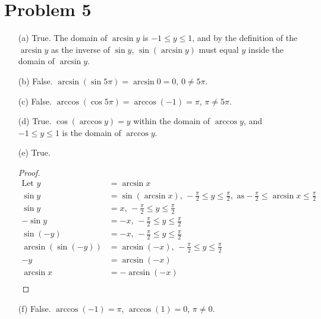 \documentclass{article}
\begin{document}
\section*{Problem 5}
\begin{itemize}
	\item[(a)]
		True. The domain of $\arcsin y$ is $-1\leq y\leq1$, and
		by the definition of the $\arcsin y$ as the inverse of
		$\sin y$, $\sin\left(\arcsin y\right)$ must equal $y$
		inside the domain of $\arcsin y$.
	\item[(b)]
		False. $\arcsin\left(\sin5\pi\right)=\arcsin0=0$,
		$0\neq5\pi$.
	\item[(c)]
		False. $\arccos\left(\cos5\pi\right)=\arccos\left(-1\right)
		=\pi$, $\pi\neq5\pi$.
	\item[(d)]
		True. $\cos\left(\arccos y\right)=y$ within the domain of
		$\arccos y$, and $-1\leq y\leq1$ is the domain of $\arccos y$.
	\item[(e)]
		True.
		\begin{proof}
		\leavevmode\vspace*{-\baselineskip}
			\begin{align*}
				\text{Let }y&=\arcsin x \\
			\sin y&=\sin\left(\arcsin x\right),\,
			-\frac{\pi}{2}\leq y\leq\frac{\pi}{2},
			\text{ as}-\frac{\pi}{2}\leq\arcsin x\leq\frac{\pi}{2} \\
			\sin y&=x,\,-\frac{\pi}{2}\leq y\leq\frac{\pi}{2} \\
			-\sin y&=-x,\,-\frac{\pi}{2}\leq y\leq\frac{\pi}{2} \\
			\sin\left(-y\right)&=-x,\,-\frac{\pi}{2}\leq y\leq\frac{\pi}{2} \\
			\arcsin\left(\sin\left(-y\right)\right)&=\arcsin\left(-x\right),\,
			-\frac{\pi}{2}\leq y\leq\frac{\pi}{2} \\
			-y&=\arcsin\left(-x\right) \\
			\arcsin x&=-\arcsin\left(-x\right) \\
		\end{align*}
		\end{proof} 
	\item[(f)]
		False. $\arccos\left(-1\right)=\pi$, $\arccos\left(1\right)=0$, $\pi\neq0$.
\end{itemize}

\pagebreak

\end{document}
